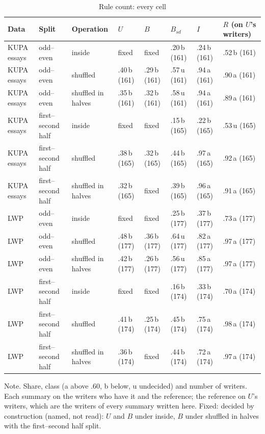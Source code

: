 \begin{table}[htbp]
\caption{Rule count: every cell}
\label{tab:cellsk}
\scriptsize
\begin{tabularx}{\linewidth}{@{}lllXXXXX@{}}
\toprule
Data & Split & Operation & $U$ & $B$ & $B_{sd}$ & $I$ & $R$ (on $U$'s writers) \\
\midrule
KUPA essays & odd--even & inside & fixed & fixed & .20\,b (161) & .24\,b (161) & .52\,b (161) \\
KUPA essays & odd--even & shuffled & .40\,b (161) & .29\,b (161) & .57\,u (161) & .94\,a (161) & .90\,a (161) \\
KUPA essays & odd--even & shuffled in halves & .35\,b (161) & .32\,b (161) & .58\,u (161) & .94\,a (161) & .89\,a (161) \\
KUPA essays & first--second half & inside & fixed & fixed & .15\,b (165) & .22\,b (165) & .53\,u (165) \\
KUPA essays & first--second half & shuffled & .38\,b (165) & .32\,b (165) & .44\,b (165) & .97\,a (165) & .92\,a (165) \\
KUPA essays & first--second half & shuffled in halves & .32\,b (165) & fixed & .39\,b (165) & .96\,a (165) & .91\,a (165) \\
LWP & odd--even & inside & fixed & fixed & .25\,b (177) & .37\,b (177) & .73\,a (177) \\
LWP & odd--even & shuffled & .48\,b (177) & .36\,b (177) & .64\,u (177) & .82\,a (177) & .97\,a (177) \\
LWP & odd--even & shuffled in halves & .42\,b (177) & .26\,b (177) & .56\,u (177) & .85\,a (177) & .97\,a (177) \\
LWP & first--second half & inside & fixed & fixed & .16\,b (174) & .33\,b (174) & .70\,a (174) \\
LWP & first--second half & shuffled & .41\,b (174) & .25\,b (174) & .45\,b (174) & .75\,a (174) & .98\,a (174) \\
LWP & first--second half & shuffled in halves & .36\,b (174) & fixed & .44\,b (174) & .72\,a (174) & .97\,a (174) \\
\bottomrule
\end{tabularx}
\par\smallskip\footnotesize Note. Share, class (a above .60, b below, u undecided) and number of writers. Each summary on the writers who have it and the reference; the reference on $U$'s writers, which are the writers of every summary written here. Fixed: decided by construction (named, not read): $U$ and $B$ under inside, $B$ under shuffled in halves with the first--second half split.
\end{table}
